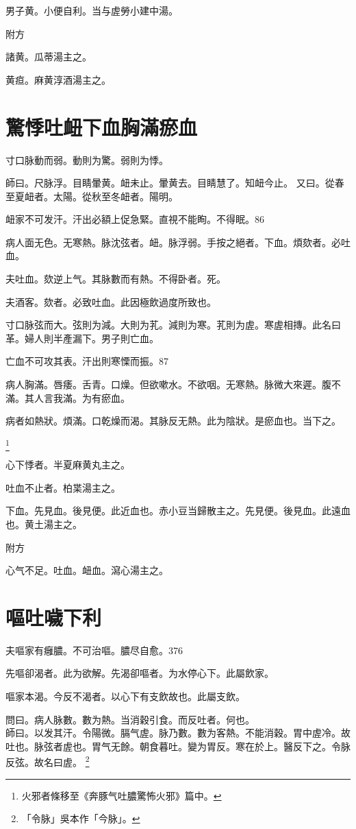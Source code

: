 男子黄。小便自利。当与虗勞小建中湯。

附方

諸黄。瓜蒂湯主之。

黄疸。麻黄淳酒湯主之。

\chapter{驚悸吐衄下血胸滿瘀血}

寸口脉動而弱。動則为驚。弱則为悸。

師曰。尺脉浮。目睛暈黄。衄未止。暈黄去。目睛慧了。知衄今止。
又曰。從春至夏衄者。太陽。從秋至冬衄者。陽明。

衄家不可发汗。汗出必額上促急{\khaaitp 緊}。直視不能眴。不得眠。86

病人面无色。无寒熱。脉沈弦者。衄。{\khaaitp 脉}浮弱。手按之絕者。下血。煩欬者。必吐血。

夫吐血。欬逆上气。其脉數而有熱。不得卧者。死。

夫酒客。欬者。必致吐血。此因極飲過度所致也。

寸口脉弦而大。弦則为減。大則为芤。減則为寒。芤則为虗。寒虗相摶。此名曰革。婦人則半產漏下。男子則亡血。

亡血不可攻其表。汗出則寒慄而振。87

病人胸滿。唇痿。舌青。口燥。但欲嗽水。不欲咽。无寒熱。脉微大來遲。腹不滿。其人言我滿。为有瘀血。

病者如熱狀。煩滿。口乾燥而渴。其脉反无熱。此为陰狀。是瘀血也。当下之。

	\footnote{火邪者條移至《奔豚气吐膿驚怖火邪》篇中。}

心下悸者。半夏麻黄丸主之。

吐血不止者。柏枼湯主之。

下血。先見血。後見便。此近血也。赤小豆当歸散主之。先見便。後見血。此遠血也。黄土湯主之。

附方

心气不足。吐血。衄血。瀉心湯主之。

\chapter{嘔吐噦下利}

夫嘔家有癰膿。不可治嘔。膿尽自愈。376

先嘔卻渴者。此为欲解。先渴卻嘔者。为水停心下。此屬飲家。

嘔家本渴。今反不渴者。以心下有支飲故也。此屬支飲。

問曰。病人脉數。數为熱。当消穀引食。而反吐者。何也。\\
師曰。以发其汗。令陽微。膈气虗。脉乃數。數为客熱。不能消穀。胃中虗冷。故吐也。脉弦者虗也。胃气无餘。朝食暮吐。變为胃反。寒在於上。醫反下之。令脉反弦。故名曰虗。
	\footnote{「令脉」吳本作「今脉」。}

